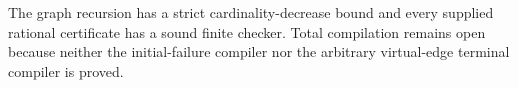The graph recursion has a strict cardinality-decrease bound and every supplied rational certificate has a sound finite checker. Total compilation remains open because neither the initial-failure compiler nor the arbitrary virtual-edge terminal compiler is proved.